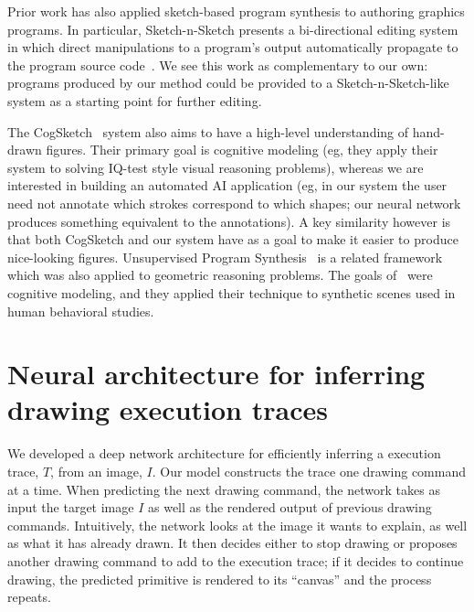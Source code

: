 \documentclass{article}
\begin{document}
Prior work has also applied sketch-based program synthesis to authoring graphics programs. In particular, Sketch-n-Sketch presents a bi-directional editing system in which direct manipulations to a program's output automatically propagate to the program source code~\cite{Hempel:2016:SSP:2984511.2984575}. We see this work as complementary to our own: programs produced by our method could be provided to a Sketch-n-Sketch-like system as a starting point for further editing.

The CogSketch~\cite{forbus2011cogsketch} system also aims to have a
high-level understanding of hand-drawn figures. Their primary goal is
cognitive modeling (eg, they apply their system to solving IQ-test
style visual reasoning problems), whereas we are interested in
building an automated AI application (eg, in our system the user need
not annotate which strokes correspond to which shapes; our neural
network produces something equivalent to the annotations).  A key
similarity however is that both CogSketch and our system have as a
goal to make it easier to produce nice-looking figures.
Unsupervised Program Synthesis~\cite{ellis2015unsupervised} is a related framework which was also applied to geometric reasoning problems. The goals of~\cite{ellis2015unsupervised} were cognitive modeling,
and they applied their technique to synthetic scenes used in human behavioral studies.





\section{Neural architecture for inferring drawing execution traces}\label{neuralNetworkSection}

We developed a deep network architecture for efficiently inferring a
execution trace, $T$, from an image, $I$.  Our model constructs the
trace one drawing command at a time.  When predicting the next drawing
command, the network takes as input the target image $I$ as well as
the rendered output of previous drawing commands.  Intuitively, the
network looks at the image it wants to explain, as well as what it has
already drawn.  It then decides either to stop drawing or proposes
another drawing command to add to the execution trace; if it decides
to continue drawing, the predicted primitive is rendered to its
``canvas'' and the process repeats.
\end{document}
